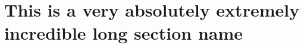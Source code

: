 \documentclass{article}
\begin{document}
\tableofcontents

\section[A shorter name for the toc]{This is a very absolutely extremely incredible long section name}
\end{document}
